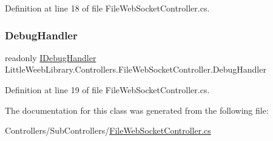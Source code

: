 Definition at line 18 of file File\+Web\+Socket\+Controller.\+cs.

\mbox{\label{class_little_weeb_library_1_1_controllers_1_1_file_web_socket_controller_a79ef455892623101bcd0acdfdf444831}} 
\subsubsection{\texorpdfstring{Debug\+Handler}{DebugHandler}}
{\footnotesize\ttfamily readonly \mbox{\hyperlink{interface_little_weeb_library_1_1_handlers_1_1_i_debug_handler}{I\+Debug\+Handler}} Little\+Weeb\+Library.\+Controllers.\+File\+Web\+Socket\+Controller.\+Debug\+Handler\hspace{0.3cm}{\ttfamily [private]}}



Definition at line 19 of file File\+Web\+Socket\+Controller.\+cs.



The documentation for this class was generated from the following file\+:\begin{DoxyCompactItemize}
\item 
Controllers/\+Sub\+Controllers/\mbox{\hyperlink{_file_web_socket_controller_8cs}{File\+Web\+Socket\+Controller.\+cs}}\end{DoxyCompactItemize}
